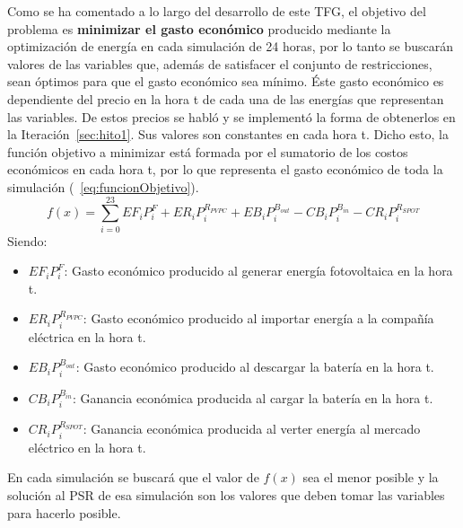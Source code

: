 Como se ha comentado a lo largo del desarrollo de este \gls{TFG}, el objetivo del problema es \textbf{minimizar el gasto económico} producido mediante la optimización de energía en cada simulación de 24 horas, por lo tanto se buscarán valores de las variables que, además de satisfacer el conjunto de restricciones, sean óptimos para que el gasto económico sea mínimo. Éste gasto económico es dependiente del precio en la hora t de cada una de las energías que representan las variables. De estos precios se habló y se implementó la forma de obtenerlos en la Iteración~\ref{sec:hito1}. Sus valores son constantes en cada hora t. Dicho esto, la función objetivo a minimizar está formada por el sumatorio de los costos económicos en cada hora t, por lo que representa el gasto económico de toda la simulación (~\ref{eq:funcionObjetivo}).
\begin{equation}
\label{eq:funcionObjetivo}
f(x) = \sum_{i=0}^{23} EF_{i}P_{i}^{F} + ER_{i}P_{i}^{R_{PVPC}} + EB_{i}P_{i}^{B_{out}} - CB_{i}P_{i}^{B_{in}} - CR_{i}P_{i}^{R_{SPOT}}
\end{equation}
Siendo:
\begin{itemize}
\item $ EF_{i}P_{i}^{F} $: Gasto económico producido al generar energía fotovoltaica en la hora t.
\item $ ER_{i}P_{i}^{R_{PVPC}} $: Gasto económico producido al importar energía a la compañía eléctrica en la hora t.
\item $ EB_{i}P_{i}^{B_{out}} $: Gasto económico producido al descargar la batería en la hora t.
\item $ CB_{i}P_{i}^{B_{in}} $: Ganancia económica producida al cargar la batería en la hora t.
\item $ CR_{i}P_{i}^{R_{SPOT}} $: Ganancia económica producida al verter energía al mercado eléctrico en la hora t.
\end{itemize}

En cada simulación se buscará que el valor de $ f(x) $ sea el menor posible y la solución al PSR de esa simulación son los valores que deben tomar las variables para hacerlo posible.

